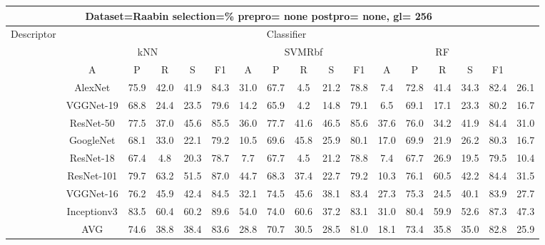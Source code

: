 \documentclass[12pt,italian]{article}
\begin{document}
\begin{tiny}
\begin{longtable}{lcccccccccccccccc}
\toprule
\multicolumn{16}{c}{Dataset=Raabin selection=\% prepro= none postpro= none, gl= 256} \\ 
\toprule
Descriptor & \multicolumn{15}{c}{Classifier} \\ 
& \multicolumn{5}{c}{kNN} & \multicolumn{5}{c}{SVMRbf} & \multicolumn{5}{c}{RF} \\ 
& A & P & R & S & F1 & A & P & R & S & F1 & A & P & R & S & F1 \\ 
\midrule
& AlexNet & 75.9 & 42.0 & 41.9 & 84.3 & 31.0 & 67.7 &  4.5 & 21.2 & 78.8 &  7.4 & 72.8 & 41.4 & 34.3 & 82.4 & 26.1 \\ 
& VGGNet-19 & 68.8 & 24.4 & 23.5 & 79.6 & 14.2 & 65.9 &  4.2 & 14.8 & 79.1 &  6.5 & 69.1 & 17.1 & 23.3 & 80.2 & 16.7 \\ 
& ResNet-50 & 77.5 & 37.0 & 45.6 & 85.5 & 36.0 & 77.7 & 41.6 & 46.5 & 85.6 & 37.6 & 76.0 & 34.2 & 41.9 & 84.4 & 31.0 \\ 
& GoogleNet & 68.1 & 33.0 & 22.1 & 79.2 & 10.5 & 69.6 & 45.8 & 25.9 & 80.1 & 17.0 & 69.9 & 21.9 & 26.2 & 80.3 & 16.7 \\ 
& ResNet-18 & 67.4 &  4.8 & 20.3 & 78.7 &  7.7 & 67.7 &  4.5 & 21.2 & 78.8 &  7.4 & 67.7 & 26.9 & 19.5 & 79.5 & 10.4 \\ 
& ResNet-101 & 79.7 & 63.2 & 51.5 & 87.0 & 44.7 & 68.3 & 37.4 & 22.7 & 79.2 & 10.3 & 76.1 & 60.5 & 42.2 & 84.4 & 31.5 \\ 
& VGGNet-16 & 76.2 & 45.9 & 42.4 & 84.5 & 32.1 & 74.5 & 45.6 & 38.1 & 83.4 & 27.3 & 75.3 & 24.5 & 40.1 & 83.9 & 27.7 \\ 
& Inceptionv3 & 83.5 & 60.4 & 60.2 & 89.6 & 54.0 & 74.0 & 60.6 & 37.2 & 83.1 & 31.0 & 80.4 & 59.9 & 52.6 & 87.3 & 47.3 \\ 
\hline
& AVG & 74.6 & 38.8 & 38.4 & 83.6 & 28.8 & 70.7 & 30.5 & 28.5 & 81.0 & 18.1 & 73.4 & 35.8 & 35.0 & 82.8 & 25.9 \\ 
\hline
\bottomrule
\end{longtable} 

 \pagebreak 
\end{tiny} 
 
\end{document}
